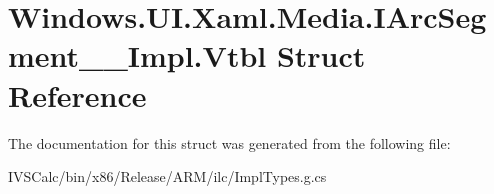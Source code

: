 \hypertarget{struct_windows_1_1_u_i_1_1_xaml_1_1_media_1_1_i_arc_segment_____impl_1_1_vtbl}{}\section{Windows.\+U\+I.\+Xaml.\+Media.\+I\+Arc\+Segment\+\_\+\+\_\+\+Impl.\+Vtbl Struct Reference}
\label{struct_windows_1_1_u_i_1_1_xaml_1_1_media_1_1_i_arc_segment_____impl_1_1_vtbl}


The documentation for this struct was generated from the following file\+:\begin{DoxyCompactItemize}
\item 
I\+V\+S\+Calc/bin/x86/\+Release/\+A\+R\+M/ilc/Impl\+Types.\+g.\+cs\end{DoxyCompactItemize}
